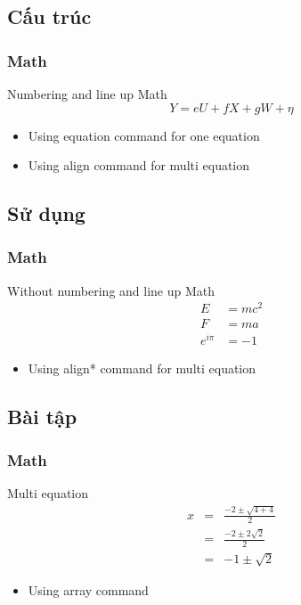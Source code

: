 \documentclass[english,10pt,table]{beamer}
\begin{document}
\subsection{Cấu trúc}
\frame
{
	\frametitle{Math}
	\begin{block}{Numbering and line up Math}	
		\begin{equation}
		Y = eU + fX + gW + \eta
		\end{equation}
		
		\begin{itemize}
			\item Using equation command for one equation
			\item Using align command for multi equation
		\end{itemize}
		
	\end{block}
}
\subsection{Sử dụng}
\frame
{
	\frametitle{Math}
	\begin{block}{Without numbering and line up Math}	
		\begin{align*}
		E & = mc^2 \\
		F & = ma \\
		e^{i \pi} & = -1
		\end{align*}		
		
		\begin{itemize}
			\item Using align* command for multi equation

		\end{itemize}
		
	\end{block}
}
\subsection{Bài tập}
\frame
{
	\frametitle{Math}
	\begin{block}{Multi equation}	
		$$
		\begin{array}{rcl}
		x & = & \frac{ -2\pm \sqrt {4+4}}{2}\\
		& = & \frac { -2\pm 2 \sqrt {2}}{2}\\
		& = & -1\pm \sqrt {2}
		\end{array}
		$$
		\begin{itemize}
			\item Using array command 
		\end{itemize}
		
	\end{block}
}
\end{document}
